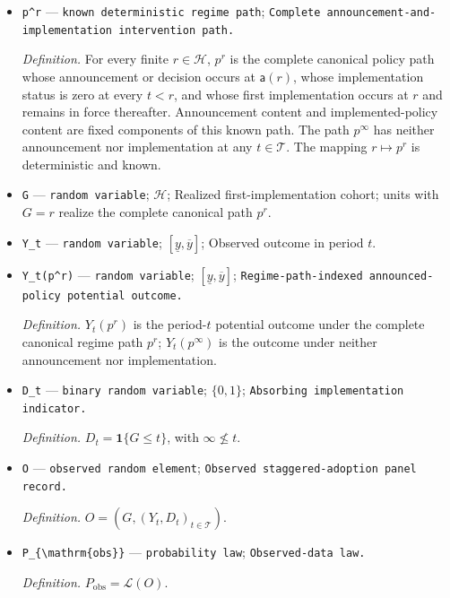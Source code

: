\documentclass{article}
\begin{document}
\begin{itemize}
  \item \texttt{p\textasciicircum{}r} --- \texttt{known deterministic regime path}; \texttt{Complete announcement-\allowbreak{}and-\allowbreak{}implementation intervention path.}
  \par\smallskip\noindent\emph{Definition.} For every finite \(r\in\mathcal H\), \(p^r\) is the complete canonical policy path whose announcement or decision occurs at \(\mathsf a(r)\), whose implementation status is zero at every \(t<r\), and whose first implementation occurs at \(r\) and remains in force thereafter. Announcement content and implemented-policy content are fixed components of this known path. The path \(p^\infty\) has neither announcement nor implementation at any \(t\in\mathcal T\). The mapping \(r\mapsto p^r\) is deterministic and known.
  \item \texttt{G} --- \texttt{random variable}; \(\mathcal H\); Realized first-implementation cohort; units with \(G=r\) realize the complete canonical path \(p^r\).
  \item \texttt{Y\_\allowbreak{}t} --- \texttt{random variable}; \([\underline y,\overline y]\); Observed outcome in period \(t\).
  \item \texttt{Y\_\allowbreak{}t(p\textasciicircum{}r)} --- \texttt{random variable}; \([\underline y,\overline y]\); \texttt{Regime-\allowbreak{}path-\allowbreak{}indexed announced-\allowbreak{}policy potential outcome.}
  \par\smallskip\noindent\emph{Definition.} \(Y_t(p^r)\) is the period-\(t\) potential outcome under the complete canonical regime path \(p^r\); \(Y_t(p^\infty)\) is the outcome under neither announcement nor implementation.
  \item \texttt{D\_\allowbreak{}t} --- \texttt{binary random variable}; \(\{0,1\}\); \texttt{Absorbing implementation indicator.}
  \par\smallskip\noindent\emph{Definition.} \(D_t=\mathbf 1\{G\le t\}\), with \(\infty\not\le t\).
  \item \texttt{O} --- \texttt{observed random element}; \texttt{Observed staggered-\allowbreak{}adoption panel record.}
  \par\smallskip\noindent\emph{Definition.} \(O=(G,(Y_t,D_t)_{t\in\mathcal T})\).
  \item \texttt{P\_\allowbreak{}\{\textbackslash{}\allowbreak{}mathrm\{obs\}\allowbreak{}\}\allowbreak{}} --- \texttt{probability law}; \texttt{Observed-\allowbreak{}data law.}
  \par\smallskip\noindent\emph{Definition.} \(P_{\mathrm{obs}}=\mathcal L(O)\).

\end{itemize}
\end{document}
